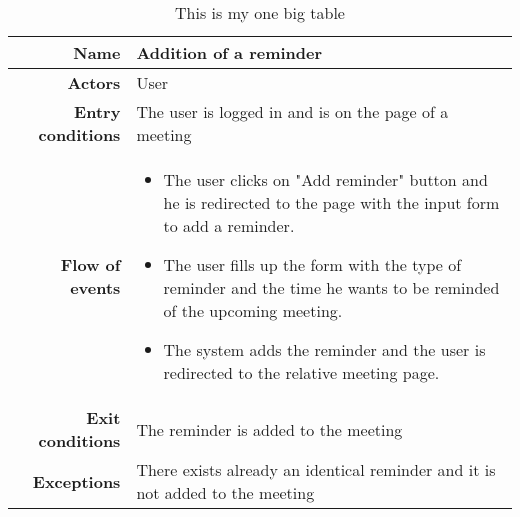 \begin{table}[htp]
\begin{tabular}{r|p{7cm}}
\bf\large Name&\bf\large Addition of a reminder\\
\hline
\hline
\bf Actors&User\\
\hline
\bf Entry conditions&The user is logged in and is on the page of a meeting\\
\hline
\bf Flow of events&
\begin{itemize}
\item The user clicks on "Add reminder" button and he is redirected to the page with the input form to add a reminder.

\item The user fills up the form with the type of reminder and the time he wants to be reminded of the upcoming meeting.

\item  The system adds the reminder and the user is redirected to the relative meeting page.

\end{itemize}
\\
\hline
\bf Exit conditions&The reminder is added to the meeting \\
\hline
\bf Exceptions&There exists already an identical reminder and it is not added to the meeting\\
\hline

\end{tabular}
\caption{This is my one big table} \label{tab:reminderaddition}
\end{table}